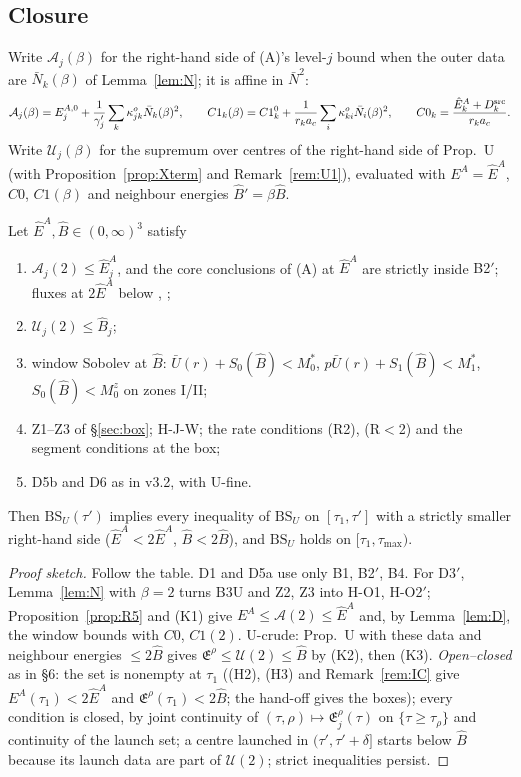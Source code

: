 \documentclass[11pt]{article}
\theoremstyle{definition}\newtheorem{definition}[theorem]{Definition}
\theoremstyle{remark}\newtheorem{remark}[theorem]{Remark}
\newcommand{\fn}[1]{\texttt{\detokenize{#1}}}
\newcommand{\E}{\mathfrak E}\newcommand{\B}{\mathfrak B}\newcommand{\Bh}{\hat B}\newcommand{\Eh}{\hat E^A}
\newcommand{\Nb}{\bar N}\newcommand{\oh}{\hat o}
\begin{document}
\subsection{Closure}
Write $\mathcal A_j(\beta)$ for the right-hand side of (A)'s level-$j$ bound when the outer data are $\Nb_k(\beta)$ of Lemma~\ref{lem:N}; it is affine in $\Nb^2$:
\[
\mathcal A_j(\beta)=E^{A,0}_j+\frac1{\gamma_j'}\sum_k\kappa^o_{jk}\Nb_k(\beta)^2,\qquad C1_k(\beta)=C1^0_k+\frac1{r_ka_c}\sum_i\kappa^o_{ki}\Nb_i(\beta)^2,\qquad C0_k=\frac{\Eh_k+D^{\rm src}_k}{r_ka_c}.
\]
Write $\mathcal U_j(\beta)$ for the supremum over centres of the right-hand side of Prop.~U (with Proposition~\ref{prop:Xterm} and Remark~\ref{rem:U1}), evaluated with $E^A=\Eh$, $C0$, $C1(\beta)$ and neighbour energies $\Bh'=\beta\Bh$.
\begin{proposition}[closure]\label{prop:close}
Let $\Eh,\Bh\in(0,\infty)^3$ satisfy
\begin{enumerate}[label=(K\arabic*),leftmargin=2.6em,itemsep=1pt]
\item $\mathcal A_j(2)\le\Eh_j$, and the core conclusions of (A) at $\Eh$ are strictly inside \textup{B2$'$}; fluxes at $2\Eh$ below \fn{FLUX0}, \fn{FLUX2};
\item $\mathcal U_j(2)\le\Bh_j$;
\item window Sobolev at $\Bh$: $\bar U(r)+S_0(\Bh)<M_0^*$, $p\bar U(r)+S_1(\Bh)<M_1^*$, $S_0(\Bh)<M_0^z$ on zones I/II;
\item \textup{Z1--Z3} of \S\ref{sec:box}; H-J-W; the rate conditions \textup{(R2)}, \textup{(R$<$2)} and the segment conditions at the box;
\item D5b and D6 as in v3.2, with U-fine.
\end{enumerate}
Then $\mathrm{BS}_U(\tau')$ implies every inequality of $\mathrm{BS}_U$ on $[\tau_1,\tau']$ with a strictly smaller right-hand side ($\Eh<2\Eh$, $\Bh<2\Bh$), and $\mathrm{BS}_U$ holds on $[\tau_1,\tau_{\max})$.
\end{proposition}
\begin{proof}[Proof sketch]
Follow the table. D1 and D5a use only B1, B2$'$, B4. For D3$'$, Lemma~\ref{lem:N} with $\beta=2$ turns B3U and Z2, Z3 into H-O1, H-O2$'$; Proposition~\ref{prop:R5} and (K1) give $E^A\le\mathcal A(2)\le\Eh$ and, by Lemma~\ref{lem:D}, the window bounds with $C0$, $C1(2)$. U-crude: Prop.~U with these data and neighbour energies $\le2\Bh$ gives $\E^\rho\le\mathcal U(2)\le\Bh$ by (K2), then (K3). \emph{Open--closed} as in \fn{launch_lemma.tex} \S6: the set is nonempty at $\tau_1$ ((H2), (H3) and Remark~\ref{rem:IC} give $E^A(\tau_1)<2\Eh$ and $\E^\rho(\tau_1)<2\Bh$; the hand-off gives the boxes); every condition is closed, by joint continuity of $(\tau,\rho)\mapsto\E^\rho_j(\tau)$ on $\{\tau\ge\tau_\rho\}$ and continuity of the launch set; a centre launched in $(\tau',\tau'+\delta]$ starts below $\Bh$ because its launch data are part of $\mathcal U(2)$; strict inequalities persist.
\end{proof}
\end{document}
